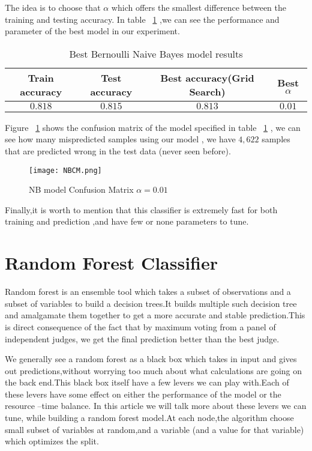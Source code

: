 \documentclass{article}
\begin{document}
The idea is to choose that $\alpha$ which offers the smallest difference between the training and testing accuracy. In table ~\ref{table:2} ,we can see the performance and  parameter of the best model in our experiment.
\begin{table}[H]
	\centering
	\begin{tabular}{|c| c| c| c|} 
		\hline
		Train accuracy & Test accuracy & Best accuracy(Grid Search) & Best $\alpha$ \\ 
		\hline\hline
		$ 0.818$ & $ 0.815$ & $0.813$ & $0.01$  \\ 
		\hline
	\end{tabular}
	\caption{{\small Best Bernoulli Naive Bayes model results}}
	\label{table:2}
\end{table} 
Figure ~\ref {fig:NBCM} shows the confusion matrix of the model specified in table ~\ref{table:2} , we can see how many mispredicted samples using our model , we have $4,622$ samples that are predicted wrong in the test data (never seen before).
\begin{figure}[H]
	\centering		
	\texttt{[image: NBCM.png]}\caption{\footnotesize NB model Confusion Matrix $\alpha = 0.01$}
	\label{fig:NBCM}		
\end{figure} 
Finally,it is worth to mention that this classifier is extremely fast for both training and prediction ,and have few or none parameters to tune.

\section{Random Forest Classifier}
Random forest is an ensemble tool which takes a subset of observations and a subset of variables to build a decision trees.It builds multiple such decision tree and amalgamate them together to get a more accurate and stable prediction.This is direct consequence of the fact that by maximum voting from a panel of independent judges, we get the final prediction better than the best judge.

We generally see a random forest as a black box which takes in input and gives out predictions,without worrying too much about what calculations are going on the back end.This black box itself have a few levers we can play with.Each of these levers have some effect on either the performance of the model or the resource –time balance. In this article we will talk more about these levers we can tune, while building a random forest model.At each node,the algorithm choose small subset of variables at random,and a variable (and a value for that variable) which optimizes the split.
\end{document}

